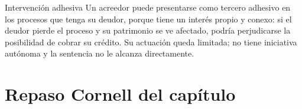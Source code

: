 \documentclass[12pt,oneside]{book}
\begin{document}
\begin{example}{Intervención adhesiva}
Un acreedor puede presentarse como tercero adhesivo en los procesos que tenga su deudor, porque tiene un interés propio y conexo: si el deudor pierde el proceso y su patrimonio se ve afectado, podría perjudicarse la posibilidad de cobrar su crédito. Su actuación queda limitada; no tiene iniciativa autónoma y la sentencia no le alcanza directamente.
\end{example}

\section*{Repaso Cornell del capítulo}
\end{document}
